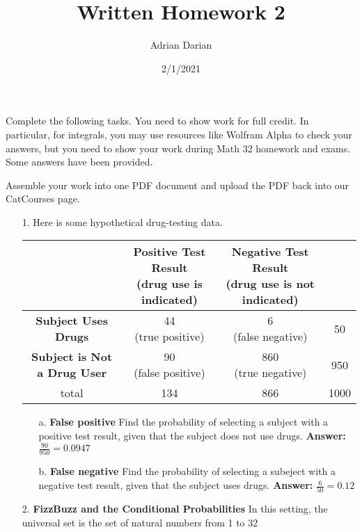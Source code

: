 \documentclass[a4paper]{article}
\title{Written Homework 2}
\author{Adrian Darian}
\date{2/1/2021}
\begin{document}
  
\maketitle
  
Complete the following tasks. You need to show work for full credit. In particular, for integrals, you may use resources like Wolfram Alpha to check your answers, but you need to show your work during Math 32 homework and exams. Some answers have been provided.

Assemble your work into one PDF document and upload the PDF back into our CatCourses page.

\begin{itemize}
	\item[1.] Here is some hypothetical drug-testing data. \\
	      \begin{tabular}{c|cc|c}
	      	                                    & \makecell{\textbf{Positive Test Result} \\ (drug use is indicated)} & \makecell{\textbf{Negative Test Result} \\ (drug use is not indicated)} & \\
	      	\hline
	      	\textbf{Subject Uses Drugs}         & \makecell{44 \\ (true positive)} & \makecell{6 \\ (false negative)} & 50 \\
	      	\hline
	      	\textbf{Subject is Not a Drug User} & \makecell{90 \\ (false positive)} & \makecell{860 \\ (true negative)} & 950 \\
	      	\hline
	      	total                               & 134                                     & 866 & 1000
	      \end{tabular} 
	      \begin{itemize}
	      	\item[a.] \textbf{False positive} Find the probability of selecting a subject with a positive test result, given that the subject does not use drugs.
	      	\textbf{Answer:} $\frac{90}{950} = 0.0947$ 
	      	\item[b.] \textbf{False negative} Find the probability of selecting a subeject with a negative test result, given that the subject uses drugs.
	      	\textbf{Answer:} $\frac{6}{50} = 0.12$
	      \end{itemize} 
	\item[2.] \textbf{FizzBuzz and the Conditional Probabilities} In this setting, the universal set is the set of natural numbers from 1 to 32 \\

\end{itemize}
\end{document}
